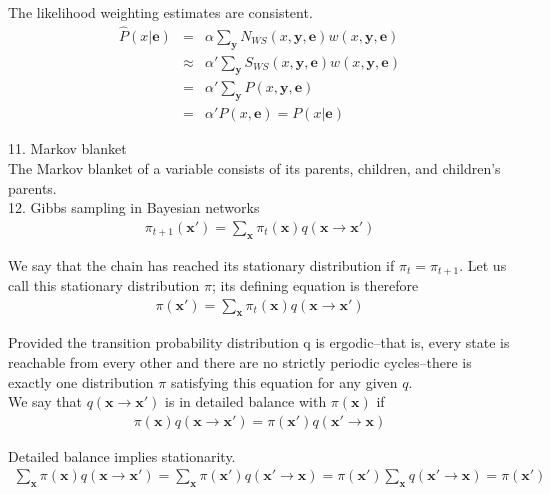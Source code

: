 \documentclass[12pt]{article}
\begin{document}
The likelihood weighting estimates are consistent.
\begin{eqnarray*}
\hat{P}(x | \boldsymbol{e})
&=& \alpha \sum_{\boldsymbol{y}} N_{WS}(x, \boldsymbol{y}, \boldsymbol{e})
    w(x, \boldsymbol{\boldsymbol{y}}, \boldsymbol{e}) \\
&\approx& \alpha' \sum_{\boldsymbol{y}} S_{WS}(x, \boldsymbol{y}, \boldsymbol{e})
          w(x, \boldsymbol{y}, \boldsymbol{e}) \\
&=& \alpha' \sum_{\boldsymbol{y}} P(x, \boldsymbol{y}, \boldsymbol{e}) \\
&=& \alpha' P(x, \boldsymbol{e}) = P(x | \boldsymbol{e})
\end{eqnarray*}

11. Markov blanket \\

The Markov blanket of a variable consists of its parents, children, and children's parents. \\

12. Gibbs sampling in Bayesian networks
\begin{eqnarray*}
\pi_{t+1}(\boldsymbol{x'})
= \sum_{\boldsymbol{x}} \pi_t(\boldsymbol{x}) q(\boldsymbol{x} 
  \rightarrow \boldsymbol{x'})
\end{eqnarray*}

We say that the chain has reached its stationary distribution if $\pi_t = \pi_{t+1}$. Let us call this stationary distribution $\pi$; its defining equation is therefore
\begin{eqnarray*}
\pi(\boldsymbol{x'})
= \sum_{\boldsymbol{x}} \pi_t(\boldsymbol{x}) q(\boldsymbol{x}
  \rightarrow \boldsymbol{x'})
\end{eqnarray*}

Provided the transition probability distribution q is ergodic--that is, every state is reachable from every other and there are no strictly periodic cycles--there is exactly one distribution $\pi$ satisfying this equation for any given $q$. \\

We say that $q(\boldsymbol{x} \rightarrow \boldsymbol{x'})$ is in detailed balance with $\pi(\boldsymbol{x})$ if 
\begin{eqnarray*}
\pi(\boldsymbol{x}) q(\boldsymbol{x} \rightarrow \boldsymbol{x'})
= \pi(\boldsymbol{x'}) q(\boldsymbol{x'} \rightarrow \boldsymbol{x})
\end{eqnarray*}

Detailed balance implies stationarity.
\begin{eqnarray*}
\sum_{\boldsymbol{x}} \pi(\boldsymbol{x}) q(\boldsymbol{x} \rightarrow \boldsymbol{x'}) = \sum_{\boldsymbol{x}} \pi(\boldsymbol{x'}) q(\boldsymbol{x'} \rightarrow \boldsymbol{x}) = \pi(\boldsymbol{x'}) \sum_{\boldsymbol{x}} q(\boldsymbol{x'} \rightarrow \boldsymbol{x}) =\pi(\boldsymbol{x'})
\end{eqnarray*}
\end{document}
